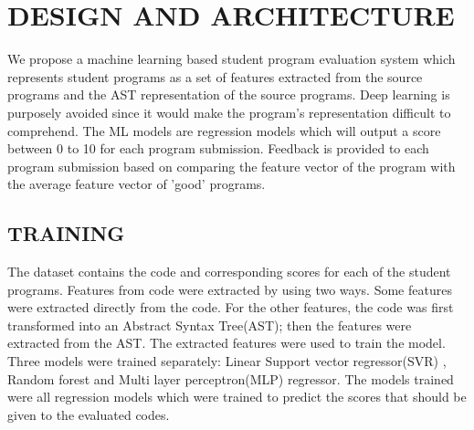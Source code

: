 
\chapter{DESIGN AND ARCHITECTURE}


We propose a machine learning based student program evaluation system which represents student programs as a set of features extracted from the source programs and the AST representation of the source programs. Deep learning is purposely avoided since it would make the program's representation difficult to comprehend. The ML models are regression models which will output a score between 0 to 10 for each program submission. Feedback is provided to each program submission based on comparing the feature vector of the program with the average feature vector of 'good' programs.


\section{TRAINING} 

The dataset contains the code and corresponding scores for each of the
student programs. Features from code were extracted by using two
ways. Some features were extracted directly from the code. For the
other features, the code was first transformed into an Abstract Syntax
Tree(AST); then the features were extracted from the AST. The extracted
features were used to train the model. Three models were trained
separately: Linear Support vector regressor(SVR) , Random forest and Multi layer
perceptron(MLP) regressor. The models trained were all regression models which were
trained to predict the scores that should be given to the evaluated
codes.

